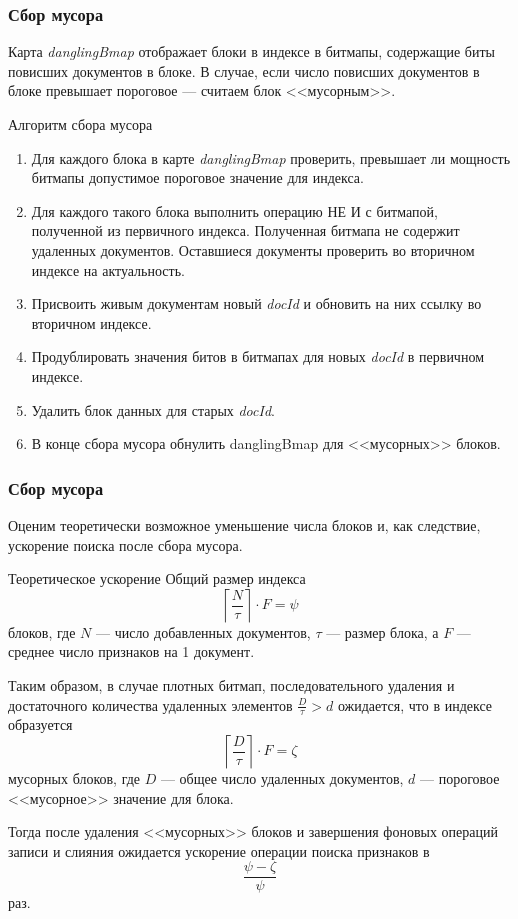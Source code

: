 \documentclass[aspectratio=169, pdf, 8pt, unicode]{beamer}
\begin{document}
\begin{frame}[fragile]
\frametitle{Сбор мусора}

Карта \textit{danglingBmap} отображает блоки в индексе в битмапы,
содержащие биты повисших документов в блоке. В случае, если число повисших документов в блоке превышает пороговое — считаем блок <<мусорным>>.

\begin{block}{Алгоритм сбора мусора}
    \begin{enumerate}
        \item Для каждого блока в карте \textit{danglingBmap} проверить, превышает ли мощность битмапы допустимое пороговое значение для индекса.
        \item Для каждого такого блока выполнить операцию НЕ И с битмапой, полученной из первичного индекса. Полученная битмапа не содержит удаленных документов. Оставшиеся документы проверить во вторичном индексе на актуальность.
        \item Присвоить живым документам новый \textit{docId} и обновить на них ссылку во вторичном индексе.
        \item Продублировать значения битов в битмапах для новых \textit{docId} в первичном индексе.
        \item Удалить блок данных для старых \textit{docId}.
        \item В конце сбора мусора обнулить danglingBmap для <<мусорных>> блоков.
    \end{enumerate}
\end{block}
\end{frame}

\begin{frame}[fragile]
\frametitle{Сбор мусора}

Оценим теоретически возможное уменьшение числа блоков и, как следствие, ускорение поиска после сбора мусора.

\begin{block}{Теоретическое ускорение}
    Общий размер индекса
    \begin{equation}
        \left\lceil\frac{N}{\tau}\right\rceil \cdot F = \psi
    \end{equation}
    блоков, где $N$ — число добавленных документов, $\tau$ — размер блока, а
    $F$ — среднее число признаков на 1 документ.

    Таким образом, в случае плотных битмап, последовательного удаления и достаточного количества удаленных элементов $\frac{D}{\tau} > d$ ожидается, что в индексе образуется
    \begin{equation}
        \left\lceil\frac{D}{\tau}\right\rceil \cdot F = \zeta
    \end{equation}
    мусорных блоков, где $D$ — общее число удаленных документов, $d$ — пороговое <<мусорное>> значение для блока.

    Тогда после удаления <<мусорных>> блоков и завершения фоновых операций
    записи и слияния ожидается ускорение операции поиска признаков в 
    \begin{equation}
        \frac{\psi - \zeta}{\psi}
    \end{equation}
    раз.
\end{block}
\end{frame}
\end{document}
